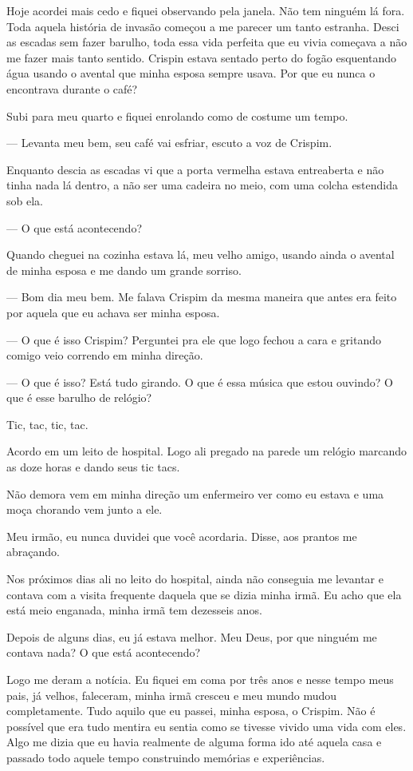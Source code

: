 Hoje acordei mais cedo e fiquei observando pela janela. Não tem ninguém lá fora. Toda aquela história de invasão começou a me parecer um tanto estranha.
Desci as escadas sem fazer barulho, toda essa vida perfeita que eu vivia começava a não me fazer mais tanto sentido. Crispin estava sentado perto do fogão esquentando água usando o avental que minha esposa sempre usava. Por que eu nunca o encontrava durante o café?

Subi para meu quarto e fiquei enrolando como de costume um tempo.

— Levanta meu bem, seu café vai esfriar, escuto a voz de Crispim.

Enquanto descia as escadas vi que a porta vermelha estava entreaberta e não tinha nada lá dentro, a não ser uma cadeira no meio, com uma colcha estendida sob ela.

— O que está acontecendo?

Quando cheguei na cozinha estava lá, meu velho amigo, usando ainda o avental de minha esposa e me dando um grande sorriso.

— Bom dia meu bem. Me falava Crispim da mesma maneira que antes era feito por aquela que eu achava ser minha esposa.

— O que é isso Crispim? Perguntei pra ele que logo fechou a cara e gritando comigo veio correndo em minha direção.

— O que é isso? Está tudo girando. O que é essa música que estou ouvindo? O que é esse barulho de relógio?

Tic, tac, tic, tac.

Acordo em um leito de hospital. Logo ali pregado na parede um relógio marcando as doze horas e dando seus tic tacs.

Não demora vem em minha direção um enfermeiro ver como eu estava e uma moça chorando vem junto a ele.

Meu irmão, eu nunca duvidei que você acordaria. Disse, aos prantos me abraçando.

Nos próximos dias ali no leito do hospital, ainda não conseguia me levantar e contava com a visita frequente daquela que se dizia minha irmã. Eu acho que ela está meio enganada, minha irmã tem dezesseis anos.

Depois de alguns dias, eu já estava melhor. Meu Deus, por que ninguém me contava nada? O que está acontecendo?

Logo me deram a notícia. Eu fiquei em coma por três anos e nesse tempo meus pais, já velhos, faleceram, minha irmã cresceu e meu mundo mudou completamente.
Tudo aquilo que eu passei, minha esposa, o Crispim. Não é possível que era tudo mentira eu sentia como se tivesse vivido uma vida com eles. Algo me dizia que eu havia realmente de alguma forma ido até aquela casa e passado todo aquele tempo construindo memórias e experiências.

